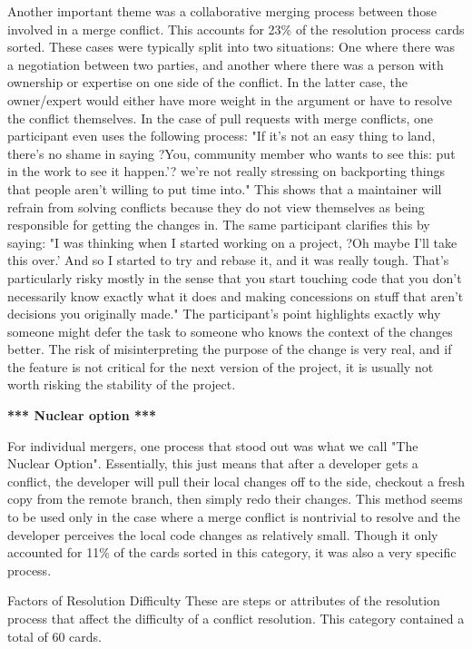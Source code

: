 \documentclass[conference]{IEEEtran}
\begin{document}
Another important theme was a collaborative merging process between those involved in a merge conflict. This accounts for 23\% of the resolution process cards sorted. These cases were typically split into two situations: One where there was a negotiation between two parties, and another where there was a person with ownership or expertise on one side of the conflict. In the latter case, the owner/expert would either have more weight in the argument or have to resolve the conflict themselves. In the case of pull requests with merge conflicts, one participant even uses the following process: 
"If it's not an easy thing to land, there's no shame in saying ?You, community member who wants to see this: put in the work to see it happen.'? we're not really stressing on backporting things that people aren't willing to put time into." 
This shows that a maintainer will refrain from solving conflicts because they do not view themselves as being responsible for getting the changes in. The same participant clarifies this by saying:
"I was thinking when I started working on a project, ?Oh maybe I'll take this over.' And so I started to try and rebase it, and it was really tough. That's particularly risky mostly in the sense that you start touching code that you don't necessarily know exactly what it does and making concessions on stuff that aren't decisions you originally made."
The participant's point highlights exactly why someone might defer the task to someone who knows the context of the changes better. The risk of misinterpreting the purpose of the change is very real, and if the feature is not critical for the next version of the project, it is usually not worth risking the stability of the project.

\textbf{*** Nuclear option ***}

For individual mergers, one process that stood out was what we call "The Nuclear Option". Essentially, this just means that after a developer gets a conflict, the developer will pull their local changes off to the side, checkout a fresh copy from the remote branch, then simply redo their changes. This method seems to be used only in the case where a merge conflict is nontrivial to resolve and the developer perceives the local code changes as relatively small. Though it only accounted for 11\% of the cards sorted in this category, it was also a very specific process. 

Factors of Resolution Difficulty
These are steps or attributes of the resolution process that affect the difficulty of a conflict resolution. This category contained a total of 60 cards.
\end{document}
